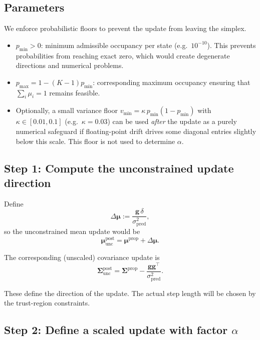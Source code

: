\documentclass[11pt]{article}
\begin{document}
\subsection{Parameters}

We enforce probabilistic floors to prevent the update from leaving the simplex.

\begin{itemize}
  \item \(p_{\min} > 0\): minimum admissible occupancy per state
        (e.g.\ \(10^{-10}\)).  This prevents probabilities from reaching exact
        zero, which would create degenerate directions and numerical problems.

  \item \(p_{\max} = 1 - (K-1)p_{\min}\): corresponding maximum occupancy
        ensuring that \(\sum_i \mu_i = 1\) remains feasible.

  \item Optionally, a small variance floor
        \(v_{\min} = \kappa\,p_{\min}(1-p_{\min})\) with
        \(\kappa\in[0.01,0.1]\) (e.g.\ \(\kappa=0.03\))
        can be used \emph{after} the update as a purely numerical safeguard
        if floating-point drift drives some diagonal entries slightly below
        this scale.  This floor is not used to determine \(\alpha\).
\end{itemize}

\subsection{Step 1: Compute the unconstrained update direction}

Define
\[
  \Delta\boldsymbol{\mu}
  :=
  \frac{\mathbf{g}\,\delta}{\sigma^2_{\text{pred}}},
\]
so the unconstrained mean update would be
\[
  \boldsymbol{\mu}^{\text{post}}_{\text{unc}}
  =
  \boldsymbol{\mu}^{\text{prop}} + \Delta\boldsymbol{\mu}.
\]

The corresponding (unscaled) covariance update is
\[
  \boldsymbol{\Sigma}^{\text{post}}_{\text{unc}}
  =
  \boldsymbol{\Sigma}^{\text{prop}} -
  \frac{\mathbf{g}\mathbf{g}^\top}{\sigma^2_{\text{pred}}}.
\]

These define the direction of the update.  The actual step length will be
chosen by the trust-region constraints.

\subsection{Step 2: Define a scaled update with factor \(\alpha\)}
\end{document}
